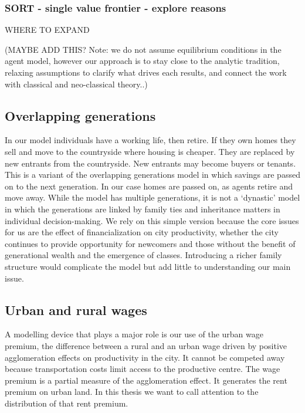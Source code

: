 \subsubsection{SORT - single value frontier - explore reasons}
WHERE TO EXPAND%

(MAYBE ADD THIS? Note: we do not assume equilibrium conditions in the agent model, however our approach is to stay close to the analytic tradition, relaxing assumptions to clarify what drives each results, and connect the work with classical and neo-classical theory..)

\subsection{Overlapping generations}
In our model individuals have a working life, then retire. If they own homes they sell and move to the countryside where housing is cheaper. They are replaced by new entrants from the countryside. New entrants may become buyers or tenants. This is a variant of the \gls{overlapping generations  model} in which savings are passed on to the next generation. In our case homes are passed on, as agents retire and move away. While the model has multiple generations, it is not a `dynastic' model in which the generations are linked by family ties and inheritance matters in individual decision-making. We rely on this simple version because the core issues for us are  the effect of financialization on city productivity, whether the city continues to provide opportunity for newcomers and those without the benefit of generational wealth and the emergence of classes. Introducing a richer family structure would complicate the model but add little to understanding  our  main  issue. 

\subsection{Urban and rural wages}
A modelling device that plays a major role is our use of the \gls{urban wage premium}, the difference between a rural and an urban wage driven by positive \gls{agglomeration effect}s on productivity in the city. It cannot be competed away because transportation costs limit access to the productive centre. The wage premium is a partial measure of the agglomeration effect. It generates the \gls{rent premium} on urban land. In this thesis we want to call attention to the distribution of that rent premium.

